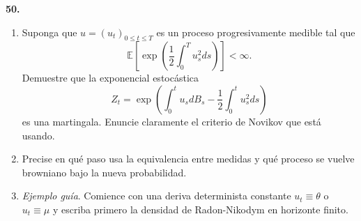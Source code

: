 \documentclass[11pt, letterpaper]{article}
\begin{document}
\begin{ejercicio}
    \textbf{50.} 
    \begin{enumerate}
        \item[(a)] Suponga que $u = (u_t)_{0 \le t \le T}$ es un proceso progresivamente medible tal que
        \[ \mathbb{E}\left[\exp\left(\frac{1}{2}\int_0^T u_s^2 ds\right)\right] < \infty. \]
        Demuestre que la exponencial estocástica
        \[ Z_t = \exp\left( \int_0^t u_s dB_s - \frac{1}{2} \int_0^t u_s^2 ds \right) \]
        es una martingala. Enuncie claramente el criterio de Novikov que está usando.
        \item[(b)] Precise en qué paso usa la equivalencia entre medidas y qué proceso se vuelve browniano bajo la nueva probabilidad.
        \item[(c)] \textit{Ejemplo guía}. Comience con una deriva determinista constante $u_t \equiv \theta$ o $u_t \equiv \mu$ y escriba primero la densidad de Radon-Nikodym en horizonte finito.
    \end{enumerate}
\end{ejercicio}

\vspace{5mm}
\end{document}
